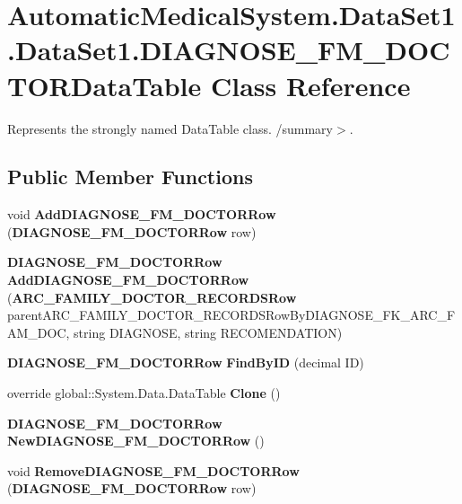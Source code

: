 \section{AutomaticMedicalSystem.DataSet1.DataSet1.DIAGNOSE\_\-FM\_\-DOCTORDataTable Class Reference}
\label{class_automatic_medical_system_1_1_data_set1_1_1_d_i_a_g_n_o_s_e___f_m___d_o_c_t_o_r_data_table}
Represents the strongly named DataTable class. /summary$>$.  


\subsection*{Public Member Functions}
\begin{CompactItemize}
\item 
void \textbf{AddDIAGNOSE\_\-FM\_\-DOCTORRow} ({\bf DIAGNOSE\_\-FM\_\-DOCTORRow} row)\label{class_automatic_medical_system_1_1_data_set1_1_1_d_i_a_g_n_o_s_e___f_m___d_o_c_t_o_r_data_table_ac9123a7886ae3311dc3c8419bc4f946}

\item 
{\bf DIAGNOSE\_\-FM\_\-DOCTORRow} \textbf{AddDIAGNOSE\_\-FM\_\-DOCTORRow} ({\bf ARC\_\-FAMILY\_\-DOCTOR\_\-RECORDSRow} parentARC\_\-FAMILY\_\-DOCTOR\_\-RECORDSRowByDIAGNOSE\_\-FK\_\-ARC\_\-FAM\_\-DOC, string DIAGNOSE, string RECOMENDATION)\label{class_automatic_medical_system_1_1_data_set1_1_1_d_i_a_g_n_o_s_e___f_m___d_o_c_t_o_r_data_table_535f6f711e021824d618e308e1b5b8a6}

\item 
{\bf DIAGNOSE\_\-FM\_\-DOCTORRow} \textbf{FindByID} (decimal ID)\label{class_automatic_medical_system_1_1_data_set1_1_1_d_i_a_g_n_o_s_e___f_m___d_o_c_t_o_r_data_table_c1dc398e868239df11b8a1351429759f}

\item 
override global::System.Data.DataTable \textbf{Clone} ()\label{class_automatic_medical_system_1_1_data_set1_1_1_d_i_a_g_n_o_s_e___f_m___d_o_c_t_o_r_data_table_2fb36fdf9166484b8e4f483158d449d6}

\item 
{\bf DIAGNOSE\_\-FM\_\-DOCTORRow} \textbf{NewDIAGNOSE\_\-FM\_\-DOCTORRow} ()\label{class_automatic_medical_system_1_1_data_set1_1_1_d_i_a_g_n_o_s_e___f_m___d_o_c_t_o_r_data_table_3182842e34c24d1a4328a5c75d4e04c3}

\item 
void \textbf{RemoveDIAGNOSE\_\-FM\_\-DOCTORRow} ({\bf DIAGNOSE\_\-FM\_\-DOCTORRow} row)\label{class_automatic_medical_system_1_1_data_set1_1_1_d_i_a_g_n_o_s_e___f_m___d_o_c_t_o_r_data_table_27c522a9627d97b208c921e3161a689d}

\end{CompactItemize}
